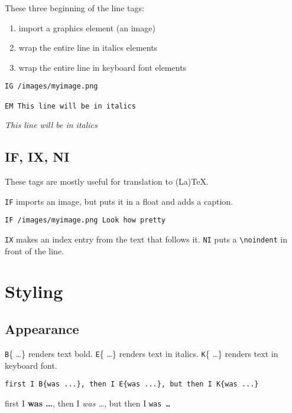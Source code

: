 These three beginning of the line tags:

\begin{enumerate}
\item import a graphics element (an image)
\item wrap the entire line in italics elements
\item wrap the entire line in keyboard font elements
\end{enumerate}

\begin{verbatim}
IG /images/myimage.png

EM This line will be in italics
\end{verbatim}

\emph{This line will be in italics}

\section{IF, IX, NI}
\label{if-ix-ni}

These tags are mostly useful for translation to (La)TeX.

\texttt{IF} imports an image, but puts it in a float and adds a caption.

\begin{verbatim}
IF /images/myimage.png Look how pretty
\end{verbatim}

\texttt{IX} makes an index entry from the text that follows it. \texttt{NI} puts a \texttt{\textbackslash noindent} in front of the line.

\chapter{Styling}
\label{styling}

\section{Appearance}
\label{appearance}

\texttt{B}\{ \ldots  \} renders text bold. \texttt{E}\{ \ldots  \} renders text in italics. \texttt{K}\{ \ldots  \} renders text in keyboard font.

\begin{verbatim}
first I B{was ...}, then I E{was ...}, but then I K{was ...}
\end{verbatim}

first I \textbf{was \ldots }, then I \emph{was \ldots }, but then I \texttt{was \ldots }

